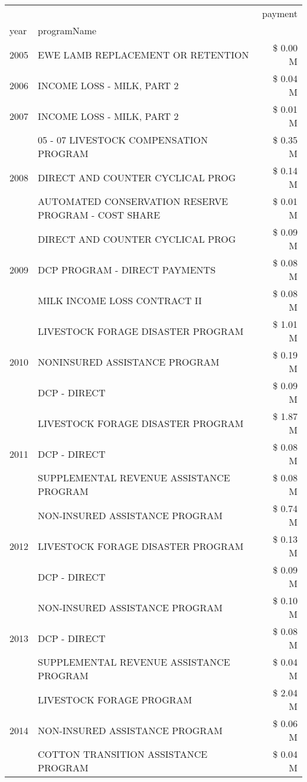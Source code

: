 \begin{tabular}{llr}
\toprule
 &  & payment \\
year & programName &  \\
\midrule
2005 & EWE LAMB REPLACEMENT OR RETENTION & \$ 0.00 M \\
\cline{1-3}
2006 & INCOME LOSS - MILK, PART 2 & \$ 0.04 M \\
\cline{1-3}
2007 & INCOME LOSS - MILK, PART 2 & \$ 0.01 M \\
\cline{1-3}
\multirow[t]{3}{*}{2008} & 05 - 07 LIVESTOCK COMPENSATION PROGRAM & \$ 0.35 M \\
 & DIRECT AND COUNTER CYCLICAL PROG & \$ 0.14 M \\
 & AUTOMATED CONSERVATION RESERVE PROGRAM - COST SHARE & \$ 0.01 M \\
\cline{1-3}
\multirow[t]{3}{*}{2009} & DIRECT AND COUNTER CYCLICAL PROG & \$ 0.09 M \\
 & DCP PROGRAM - DIRECT PAYMENTS & \$ 0.08 M \\
 & MILK INCOME LOSS CONTRACT II & \$ 0.08 M \\
\cline{1-3}
\multirow[t]{3}{*}{2010} & LIVESTOCK FORAGE DISASTER PROGRAM & \$ 1.01 M \\
 & NONINSURED ASSISTANCE PROGRAM & \$ 0.19 M \\
 & DCP - DIRECT & \$ 0.09 M \\
\cline{1-3}
\multirow[t]{3}{*}{2011} & LIVESTOCK FORAGE DISASTER PROGRAM & \$ 1.87 M \\
 & DCP - DIRECT & \$ 0.08 M \\
 & SUPPLEMENTAL REVENUE ASSISTANCE PROGRAM & \$ 0.08 M \\
\cline{1-3}
\multirow[t]{3}{*}{2012} & NON-INSURED ASSISTANCE PROGRAM & \$ 0.74 M \\
 & LIVESTOCK FORAGE DISASTER PROGRAM & \$ 0.13 M \\
 & DCP - DIRECT & \$ 0.09 M \\
\cline{1-3}
\multirow[t]{3}{*}{2013} & NON-INSURED ASSISTANCE PROGRAM & \$ 0.10 M \\
 & DCP - DIRECT & \$ 0.08 M \\
 & SUPPLEMENTAL REVENUE ASSISTANCE PROGRAM & \$ 0.04 M \\
\cline{1-3}
\multirow[t]{3}{*}{2014} & LIVESTOCK FORAGE PROGRAM & \$ 2.04 M \\
 & NON-INSURED ASSISTANCE PROGRAM & \$ 0.06 M \\
 & COTTON TRANSITION ASSISTANCE PROGRAM & \$ 0.04 M \\

\end{tabular}
